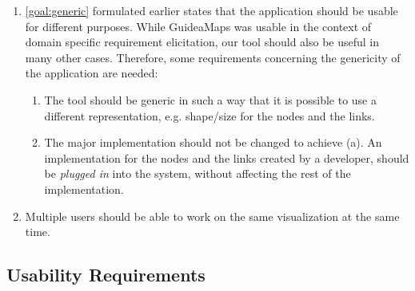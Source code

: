 \begin{enumerate}[label=\textbf{FR \arabic*}., labelindent=0.5cm, ref=FR \arabic*, leftmargin=*]
	\item \label{fr:genericity}
		\ref{goal:generic} formulated earlier states that the application should be usable for different purposes. While GuideaMaps was usable in the context of domain specific requirement elicitation, our tool should also be useful in many other cases. Therefore, some requirements concerning the genericity of the application are needed:
  	\begin{enumerate}
		\item The tool should be generic in such a way that it is possible to use a different representation, e.g. shape/size for the nodes and the links.
		\item The major implementation should not be changed to achieve (a). An implementation for the nodes and the links created by a developer, should be \textit{plugged in} into the system, without affecting the rest of the implementation.
	\end{enumerate}
	
	\item \label{fr:work-simultaneously}
		Multiple users should be able to work on the same visualization at the same time.
  
\end{enumerate}



\subsection{Usability Requirements}\label{sec:usability-requirements}

